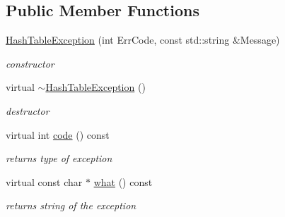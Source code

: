 \subsection*{Public Member Functions}
\begin{DoxyCompactItemize}
\item 
\hypertarget{classHashTableException_a4da43b89eec208edf24e37a4735116f1}{\hyperlink{classHashTableException_a4da43b89eec208edf24e37a4735116f1}{Hash\-Table\-Exception} (int Err\-Code, const std\-::string \&Message)}\label{classHashTableException_a4da43b89eec208edf24e37a4735116f1}

\begin{DoxyCompactList}\small\item\em constructor \end{DoxyCompactList}\item 
\hypertarget{classHashTableException_a592b30a91cf7b647793541fc8ccccc77}{virtual \hyperlink{classHashTableException_a592b30a91cf7b647793541fc8ccccc77}{$\sim$\-Hash\-Table\-Exception} ()}\label{classHashTableException_a592b30a91cf7b647793541fc8ccccc77}

\begin{DoxyCompactList}\small\item\em destructor \end{DoxyCompactList}\item 
\hypertarget{classHashTableException_a53dd4071876d56f017c93238e93e7959}{virtual int \hyperlink{classHashTableException_a53dd4071876d56f017c93238e93e7959}{code} () const }\label{classHashTableException_a53dd4071876d56f017c93238e93e7959}

\begin{DoxyCompactList}\small\item\em returns type of exception \end{DoxyCompactList}\item 
\hypertarget{classHashTableException_ad8abf214bbfed4ffaa7ae7dee4640d2e}{virtual const char $\ast$ \hyperlink{classHashTableException_ad8abf214bbfed4ffaa7ae7dee4640d2e}{what} () const }\label{classHashTableException_ad8abf214bbfed4ffaa7ae7dee4640d2e}

\begin{DoxyCompactList}\small\item\em returns string of the exception \end{DoxyCompactList}\end{DoxyCompactItemize}
